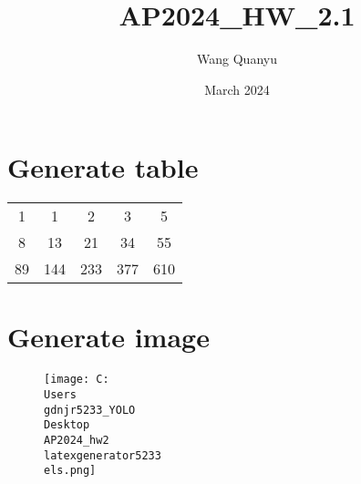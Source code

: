\documentclass{article}
\title{AP2024\_HW\_2.1}
\author{Wang Quanyu}
\date{March 2024}
\begin{document}
\maketitle

\section{Generate table}
\begin{tabular}{|c|c|c|c|c|}
\hline
1 & 1 & 2 & 3 & 5 \\
8 & 13 & 21 & 34 & 55 \\
89 & 144 & 233 & 377 & 610 \\
\hline
\end{tabular}

\section{Generate image}
\begin{figure}[h]
\raggedright
\texttt{[image: C:\\Users\\gdnjr5233\_YOLO\\Desktop\\AP2024\_hw2\\latexgenerator5233\\els.png]}
\end{figure}
\end{document}
